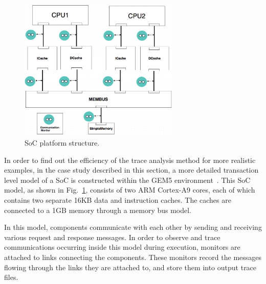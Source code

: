 \documentclass[conference]{IEEEtran}
\begin{document}


\begin{figure} 
\centerline{
\includegraphics[width=3in]{figures/Fig4.png}}
\caption{SoC platform structure.}
\label{SoC}
\end{figure}

In order to find out the efficiency of the trace analysis
method for more realistic examples, in the case study
described in this section, a more detailed transaction level
model of a SoC is constructed within the GEM5
environment~\cite{Binkert2011}.  This SoC model, as shown in Fig.~\ref{SoC},
consists of
two ARM Cortex-A9 cores, each of which contains two separate
16KB data and instruction caches.  The caches are connected
to a 1GB memory through a memory bus model. 

In this model, components communicate with each other by
sending and receiving various request and response messages.
In order to observe and trace communications occurring
inside this model during execution, monitors are attached to
links connecting the components. These monitors record the
messages flowing through the links they are attached to, and
store them into output trace files.
\end{document}
